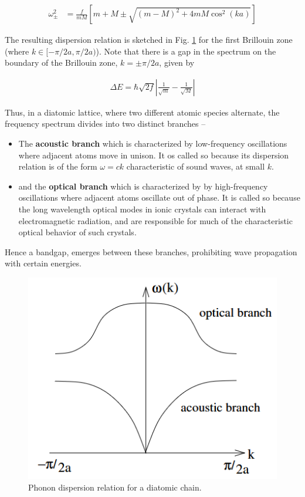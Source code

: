 \begin{align}
    \omega^2_{\pm} &= \frac{f}{mM}\left[m+M\pm \sqrt{(m-M)^2+4mM\cos^2(ka)}\right] 
\end{align}

The resulting dispersion relation is sketched in Fig. \ref{f3} for the first Brillouin zone (where $k \in [-\pi/2a, \pi/2a)$).
Note that there is a gap in the spectrum on the boundary of the Brillouin zone, $k = \pm \pi/2a$, given by

\begin{align}
    \Delta E = \hbar \sqrt{2f} \left|\frac{1}{\sqrt{m}}-\frac{1}{\sqrt{M}}\right|
\end{align}

Thus, in a diatomic lattice, where two different atomic species alternate, the frequency spectrum divides into two distinct branches --

\begin{itemize}
    \item The \textbf{acoustic branch} which is characterized by low-frequency oscillations where adjacent atoms move in unison. It os called so because its dispersion relation is of the form $\omega= ck$ characteristic of sound waves, at small $k$.
    \item and the \textbf{optical branch} which is characterized by by high-frequency oscillations where adjacent atoms oscillate out of phase. It is called so because the long wavelength optical modes in ionic crystals can interact with electromagnetic radiation, and are responsible for much of the characteristic optical behavior of such crystals.\\
\end{itemize}

Hence a bandgap, emerges between these
branches, prohibiting wave propagation with certain energies.

\begin{figure}
    \centering
    \includegraphics[width=.8\columnwidth]{images/th1.png}
    \caption{Phonon dispersion relation for a diatomic chain.}
    \label{f3}
\end{figure}


